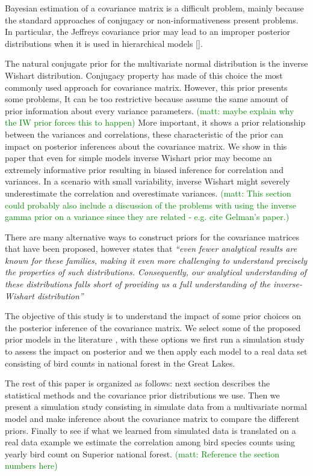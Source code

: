 \documentclass[a4paper]{article}
\newcommand{\matt}[1]{\textcolor{green}{(matt: #1)}}
\begin{document}
Bayesian estimation of a covariance matrix is a difficult problem, mainly because the standard approaches of conjugacy or non-informativeness present problems. In particular, the  Jeffreys covariance prior may lead to an improper posterior distributions when it is used in hierarchical models \ref{}.  

The natural conjugate prior for the multivariate normal distribution is the inverse Wishart distribution. Conjugacy property has made of this choice the most commonly used approach for covariance matrix. However, this prior presents some problems, It can be too restrictive because assume the same amount of prior information about every variance parameters. \matt{maybe explain why the IW prior forces this to happen} More important, it shows a prior relationship between the variances and correlations, these characteristic of the prior can impact on posterior inferences about the covariance matrix. We show in this paper that even for simple models inverse Wishart prior may become an extremely informative prior resulting in biased inference for correlation and variances. In a scenario with small variability, inverse Wishart might severely underestimate the correlation and overestimate variances. \matt{This section could probably also include a discussion of the problems with using the inverse gamma prior on a variance since they are related - e.g. cite Gelman's paper.}

There are many alternative ways to construct priors for the covariance matrices that have been proposed,  however \cite{visualize} states that 
 \textit{``even fewer analytical results are known for these families, making it even more challenging to understand precisely the properties of such distributions. Consequently, our analytical understanding of these distributions falls short of providing us a full understanding of the inverse-Wishart distribution'' }
 
The objective of this study is to understand the impact of some prior choices on the posterior inference of the covariance matrix. We select some of the proposed prior models in the literature , with these options we first run a simulation study to assess the impact on posterior and we then apply each model  to a real data set consisting of bird counts in national forest in the Great Lakes. 

The rest of this paper is organized as follows: next section describes the statistical methods and the covariance prior distributions we use. Then we present a simulation study consisting in simulate data from a multivariate normal model and make inference about the covariance matrix to compare the different priors. Finally to see if what we learned from simulated data is translated on a real data example we estimate the correlation among bird species counts using yearly bird count on Superior national forest. \matt{Reference the section numbers here}
\end{document}
